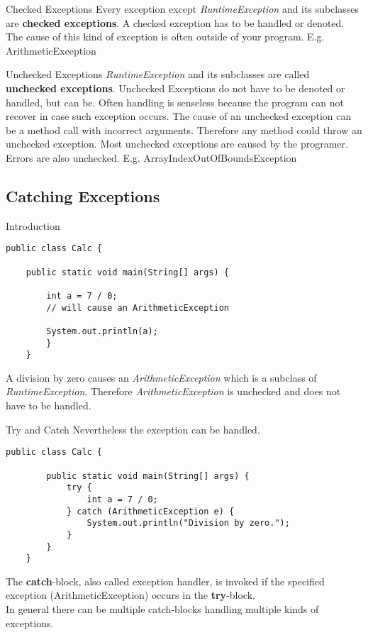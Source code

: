 \begin{frame}{Checked Exceptions}
	Every exception except \emph{RuntimeException} and its subclasses are \textbf{checked exceptions}.
	\vfill
	A checked exception has to be handled or denoted.
	\vfill
	The cause of this kind of exception is often outside of your program.
	\vfill
	E.g. ArithmeticException
\end{frame}

\begin{frame}{Unchecked Exceptions}
	\emph{RuntimeException} and its subclasses are called \textbf{unchecked exceptions}.
	\vfill
	Unchecked Exceptions do not have to be denoted or handled, but can be.
	Often handling is senseless because the program can not recover 
	in case such exception occurs.
	\vfill
	The cause of an unchecked exception can be a method call with incorrect arguments.
	Therefore any method could throw an unchecked exception.
	Most unchecked exceptions are caused by the programer.
	\vfill
	Errors are also unchecked.
	\vfill
	E.g. ArrayIndexOutOfBoundsException
\end{frame}

\subsection{Catching Exceptions}	
\begin{frame}[fragile]{Introduction}
	\begin{lstlisting}[basicstyle=\ttfamily\scriptsize]
	public class Calc {
	
	public static void main(String[] args) {
	
		int a = 7 / 0;
		// will cause an ArithmeticException
		
		System.out.println(a);
		}
	}
	\end{lstlisting}
	A division by zero causes an \emph{ArithmeticException} which is a subclass of \emph{RuntimeException}. 
	Therefore \emph{ArithmeticException} is unchecked and does not have to be handled.
\end{frame}

\begin{frame}[fragile]{Try and Catch}
	Nevertheless the exception can be handled.
	\begin{lstlisting}[basicstyle=\ttfamily\scriptsize]
	public class Calc {
	
		public static void main(String[] args) {
			try {
				int a = 7 / 0;
			} catch (ArithmeticException e) {
				System.out.println("Division by zero.");
			}
		}
	}
	\end{lstlisting}
	The \textbf{catch}-block, also called exception handler,
	is invoked if the specified exception (ArithmeticException) occurs in the \textbf{try}-block.\\
	In general there can be multiple catch-blocks handling multiple kinds of exceptions.
\end{frame}


